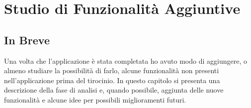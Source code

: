 \chapter{Studio di Funzionalità Aggiuntive}

\section{In Breve}
Una volta che l'applicazione è stata completata ho avuto modo di aggiungere, o almeno studiare la possibilità di farlo, alcune funzionalità non presenti nell'applicazione prima del tirocinio. 
In questo capitolo si presenta una descrizione della fase di analisi e, quando possibile, aggiunta delle nuove funzionalità e alcune idee per possibili miglioramenti futuri.